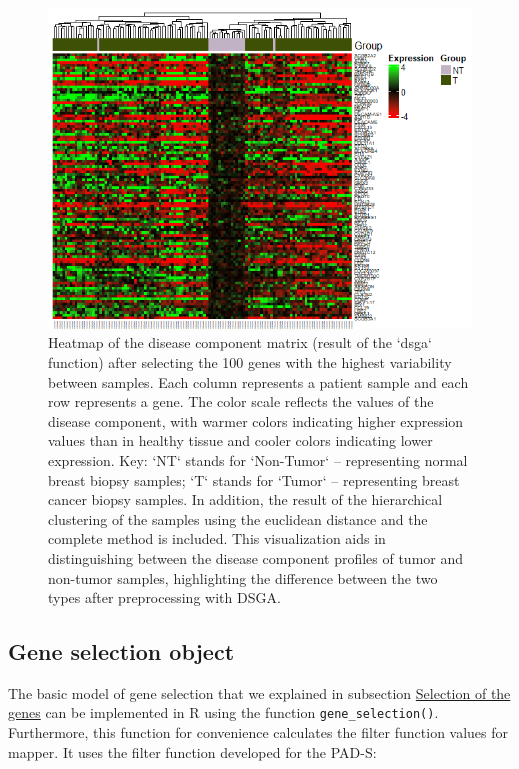 \begin{figure}
\includegraphics[width=1\linewidth,height=0.3\textheight]{Figures/print_DSGA_information} \caption{Heatmap of the disease component matrix (result of the `dsga` function) after selecting the 100 genes with the highest variability between samples. Each column represents a patient sample and each row represents a gene. The color scale reflects the values of the disease component, with warmer colors indicating higher expression values than in healthy tissue and cooler colors indicating lower expression. Key: `NT` stands for `Non-Tumor` – representing normal breast biopsy samples; `T` stands for `Tumor` – representing breast cancer biopsy samples. In addition, the result of the hierarchical clustering of the samples using the euclidean distance and the complete method is included. This visualization aids in distinguishing between the disease component profiles of tumor and non-tumor samples, highlighting the difference between the two types after preprocessing with DSGA.}\label{fig:fig1}
\end{figure}

\hypertarget{section4.2}{%
\subsection{Gene selection object}\label{section4.2}}

The basic model of gene selection that we explained in subsection \protect\hyperlink{section2.2}{Selection of the genes} can be implemented in R using the function \texttt{gene\_selection()}. Furthermore, this function for convenience calculates the filter function values for mapper. It uses the filter function developed for the PAD-S:

